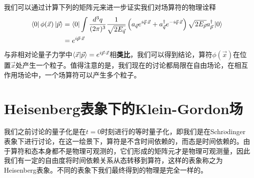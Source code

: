我们可以通过计算下列的矩阵元来进一步证实我们对场算符的物理诠释
\begin{equation}
\begin{aligned}
    \bra{0}\phi(\vec{x})\ket{\vec{p}}&=\bra{0}\int \frac{d^{3}q}{(2\pi)^{3}}\frac{1}{\sqrt{2E_{\vec{q}}}}\left(a_{\vec{q}}e^{i\vec{q}\cdot\vec{x}}+a^{\dagger}_{\vec{q}}e^{-i\vec{q}\cdot\vec{x}}\right)\sqrt{2E_{\vec{p}}}a^{\dagger}_{\vec{p}}\ket{0}\\
    &=e^{i\vec{p}\cdot\vec{x}}
    \end{aligned}
\end{equation}
与非相对论量子力学中$\bra{\vec{x}}\ket{\vec{p}}=e^{i\vec{p}\cdot\vec{x}}$相\textbf{类比}，我们可以得到结论，算符$\phi(\vec{x})$在位置$\vec{x}$处产生一个粒子。值得注意的是，我们现在的讨论都局限在自由场论，在相互作用场论中，一个场算符可以产生多个粒子。
\section{Heisenberg表象下的Klein-Gordon场}
我们之前讨论的量子化是在$t=0$时刻进行的等时量子化，即我们是在Schr$\ddot{o}$dinger表象下进行讨论，在这一绘景下，算符是不含时间依赖的，而态是时间依赖的。由于算符和态本身都不是物理可观测的，它们形成的矩阵元才是物理可观测量，因此我们有一定的自由度将时间依赖关系从态转移到算符，这样的表象称之为Heisenberg表象。不同的表象下我们最终得到的物理是完全一样的。

